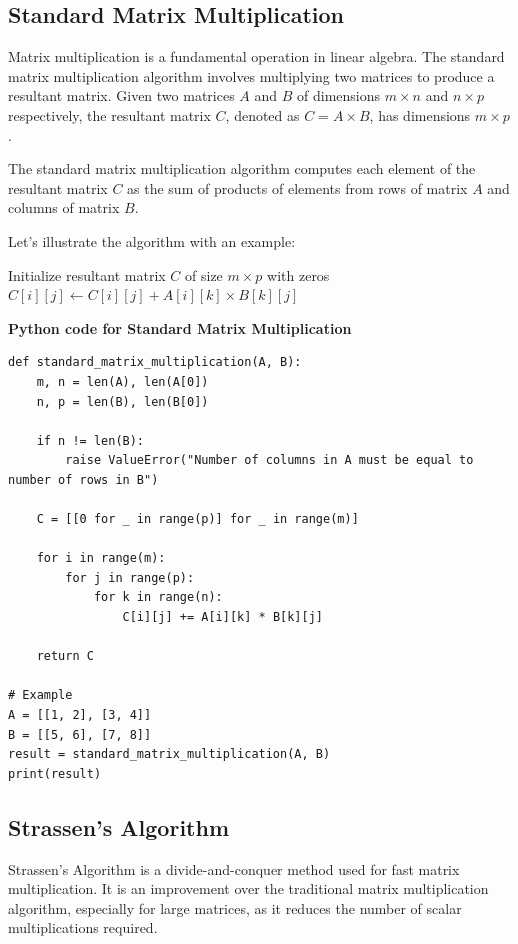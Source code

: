 \documentclass[12pt]{book} %
\begin{document}
\subsection{Standard Matrix Multiplication}
Matrix multiplication is a fundamental operation in linear algebra. 
The standard matrix multiplication algorithm involves multiplying two matrices to produce a resultant matrix. 
Given two matrices $A$ and $B$ of dimensions $m \times n$ and $n \times p$ respectively, 
the resultant matrix $C$, denoted as $C = A \times B$, has dimensions $m \times p$.

The standard matrix multiplication algorithm computes each element of the resultant matrix $C$ as the sum of products of elements from rows of matrix $A$ and columns of matrix $B$.

Let's illustrate the algorithm with an example:
\FloatBarrier
\begin{algorithm}
\caption{Standard Matrix Multiplication}
\begin{algorithmic}[1]
\State Initialize resultant matrix $C$ of size $m \times p$ with zeros
            \State $C[i][j] \gets C[i][j] + A[i][k] \times B[k][j]$
        \EndFor
    \EndFor
\EndFor
\end{algorithmic}
\end{algorithm}
\FloatBarrier
\textbf{Python code for Standard Matrix Multiplication}
\FloatBarrier
\begin{lstlisting}
def standard_matrix_multiplication(A, B):
    m, n = len(A), len(A[0])
    n, p = len(B), len(B[0])
    
    if n != len(B):
        raise ValueError("Number of columns in A must be equal to number of rows in B")
    
    C = [[0 for _ in range(p)] for _ in range(m)]
    
    for i in range(m):
        for j in range(p):
            for k in range(n):
                C[i][j] += A[i][k] * B[k][j]
    
    return C

# Example
A = [[1, 2], [3, 4]]
B = [[5, 6], [7, 8]]
result = standard_matrix_multiplication(A, B)
print(result)
\end{lstlisting}

\subsection{Strassen's Algorithm}
Strassen's Algorithm is a divide-and-conquer method used for fast matrix multiplication. It is an improvement over the traditional matrix multiplication algorithm, especially for large matrices, as it reduces the number of scalar multiplications required.
\end{document}
